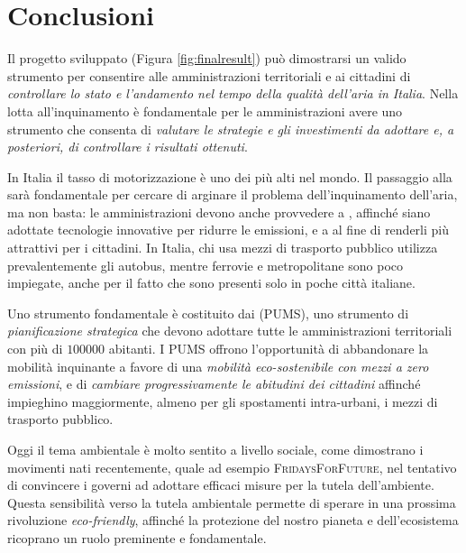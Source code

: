 \chapter{Conclusioni}

Il progetto sviluppato (Figura \ref{fig:finalresult}) può dimostrarsi un valido
strumento per consentire alle amministrazioni territoriali e ai cittadini di
\emph{controllare lo stato e l'andamento nel tempo della qualità dell'aria in
Italia}. Nella lotta all'inquinamento è fondamentale per le amministrazioni
avere uno strumento che consenta di \emph{valutare le strategie e gli
investimenti da adottare e, a posteriori, di controllare i risultati ottenuti}.

In Italia il tasso di motorizzazione è uno dei più alti nel mondo. Il passaggio
alla  sarà fondamentale per cercare di arginare il
problema dell'inquinamento dell'aria, ma non basta: le amministrazioni devono
anche provvedere a , affinché siano
adottate tecnologie innovative per ridurre le emissioni, e a
 al fine di renderli più
attrattivi per i cittadini. In Italia, chi usa mezzi di trasporto pubblico
utilizza prevalentemente gli autobus, mentre ferrovie e metropolitane sono poco
impiegate, anche per il fatto che sono presenti solo in poche città italiane.

Uno strumento fondamentale è costituito dai  (PUMS), uno strumento di \emph{pianificazione strategica}
che devono adottare tutte le amministrazioni territoriali con più di \(100000\)
abitanti.  I PUMS offrono l'opportunità di abbandonare la mobilità inquinante a
favore di una \emph{mobilità eco-sostenibile con mezzi a zero emissioni}, e di
\emph{cambiare progressivamente le abitudini dei cittadini} affinché impieghino
maggiormente, almeno per gli spostamenti intra-urbani, i mezzi di trasporto
pubblico.

Oggi il tema ambientale è molto sentito a livello sociale, come dimostrano i
movimenti nati recentemente, quale ad esempio \textsc{FridaysForFuture}, nel
tentativo di convincere i governi ad adottare efficaci misure per la tutela
dell'ambiente. Questa sensibilità verso la tutela ambientale permette di sperare
in una prossima rivoluzione \textit{eco-friendly}, affinché la protezione del
nostro pianeta e dell'ecosistema ricoprano un ruolo preminente e fondamentale.

